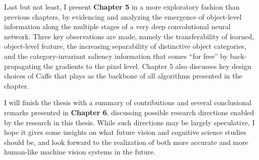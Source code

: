 Last but not least, I present {\bfseries Chapter 5} in a more exploratory fashion than previous chapters, by evidencing and analyzing the emergence of object-level information along the multiple stages of a very deep convolutional neural network. Three key observations are made, namely the transferability of learned, object-level feature, the increasing  separability of distinctive object categories, and the category-invariant saliency information that comes ``for free'' by back-propagating the gradients to the pixel level. Chapter 5 also discusses key design choices of Caffe that plays as the backbone of all algorithms presented in the chapter.

I will finish the thesis with a summary of contributions and several conclusional remarks presented in {\bfseries Chapter 6}, discussing possible research directions enabled by the research in this thesis. While such directions may be largely speculative, I hope it gives some insights on what future vision and cognitive science studies should be, and look forward to the realization of both more accurate and more human-like machine vision systems in the future.

